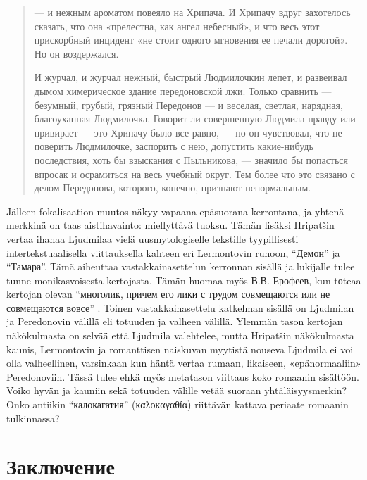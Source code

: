 \documentclass[12pt,a4paper]{article}
\begin{document}
\begin{quote}

— и нежным ароматом повеяло на Хрипача. И Хрипачу
вдруг захотелось сказать, что она «прелестна, как ангел небесный», и
что весь этот прискорбный инцидент «не стоит одного мгновения ее 
печали дорогой». Но он воздержался.

И журчал, и журчал нежный, быстрый Людмилочкин лепет, и 
развеивал дымом химерическое здание передоновской лжи. Только 
сравнить — безумный, грубый, грязный Передонов — и веселая, светлая,
нарядная, благоуханная Людмилочка. Говорит ли совершенную 
Людмила правду или привирает — это Хрипачу было все равно, — но он 
чувствовал, что не поверить Людмилочке, заспорить с нею, допустить 
какие-нибудь последствия, хоть бы взыскания с Пыльникова, — значило
бы попасться впросак и осрамиться на весь учебный округ. Тем более
что это связано с делом Передонова, которого, конечно, признают 
ненормальным. \parencite[240]{sologub2004}
\end{quote}

Jälleen fokalisaation muutos näkyy vapaana epäsuorana kerrontana, ja yhtenä merkkinä on taas aistihavainto: miellyttävä tuoksu. %
Tämän lisäksi Hripatšin vertaa ihanaa Ljudmilaa vielä uusmytologiselle tekstille tyypillisesti intertekstuaalisella viittauksella kahteen eri Lermontovin runoon, \enquote{Демон} ja \enquote{Тамара}. Тämä aiheuttaa vastakkainasettelun kerronnan sisällä ja lukijalle tulee tunne monikasvoisesta kertojasta. Tämän huomaa myös В.В. Ерофеев, kun tоteaa kertojan olevan \enquote{многолик, причем его лики с трудом совмещаются или не совмещаются вовсе} \parencite[157]{jerofeev1985}. Toinen vastakkainasettelu katkelman sisällä on Ljudmilan ja Peredonovin välillä eli totuuden ja valheen välillä. Ylemmän tason kertojan näkökulmasta on selvää että Ljudmila valehtelee, mutta Hripatšin näkökulmasta kaunis, Lermontovin ja romanttisen naiskuvan myytistä nouseva Ljudmila ei voi olla valheellinen, varsinkaan kun häntä vertaa rumaan, likaiseen, «epänormaaliin» Peredonoviin. Tässä tulee ehkä myös metatason viittaus koko romaanin sisältöön. Voiko hyvän ja kauniin sekä totuuden välille vetää suoraan yhtäläisyysmerkin? Onko antiikin \enquote{калокагатия} (\foreignlanguage{greek}{καλοκαγαθία}) riittävän kattava periaate romaanin tulkinnassa?


\section{Заключение}



\printbibheading[heading=bibliography,title={Список использованной литературы}]
\printbibliography[heading=subbibliography,keyword={primary},title={Источники}]
\printbibliography[heading=subbibliography,notkeyword={primary},title={Исследовательская литература}]
\end{document}
